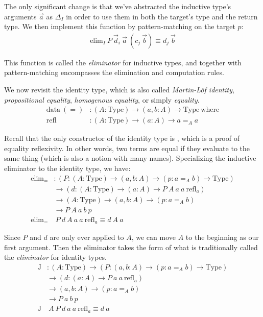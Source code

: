 \documentclass{report}
\newcommand{\const}[1]{\text{#1}}
\newcommand{\data}{\const{data}}
\newcommand{\Type}{\const{Type}}
\newcommand{\where}{\const{where}}
\newcommand{\elim}{\const{elim}}
\newcommand{\refl}{\const{refl}}
\newcommand{\jelim}{\const{J}\xspace}
\begin{document}
The only significant change is that we've abstracted the inductive type's arguments $\Vec{a}$ as $\Delta_I$ in order to use them in both the target's type and the return type. We then implement this function by pattern-matching on the target $p$:
%
\begin{align*}
    \elim_I ~ P ~ \Vec{d}_i ~ \Vec{a} ~ (c_j ~ \Vec{b}) \equiv d_j ~ \Vec{b}
\end{align*}

This function is called the \emph{eliminator} for inductive types, and together with pattern-matching encompasses the elimination and computation rules.

We now revisit the identity type, which is also called \emph{Martin-L\"of identity}, \emph{propositional equality}, \emph{homogenous equality}, or simply \emph{equality}.
%
\begin{align*}
    \data ~ (=) &: (A : \Type) \to (a, b : A) \to \Type ~ \where \\
    \refl &: (A : \Type) \to (a : A) \to a =_A a
\end{align*}

Recall that the only constructor of the identity type is \refl, which is a proof of equality reflexivity. In other words, two terms are equal if they evaluate to the same thing (which is also a notion with many names). Specializing the inductive eliminator to the identity type, we have:
%
\begin{align*}
    \elim_= &: (P : (A : \Type) \to (a, b : A) \to (p : a =_A b) \to \Type) \\
    &\to (d : (A : \Type) \to (a : A) \to P ~ A ~ a ~ a ~ \refl_a) \\
    &\to (A : \Type) \to (a, b : A) \to (p : a =_A b) \\
    &\to P ~ A ~ a ~ b ~ p \\
    \elim_= &~ P ~ d ~ A ~ a ~ a ~ \refl_a \equiv d ~ A ~ a
\end{align*}

Since $P$ and $d$ are only ever applied to $A$, we can move $A$ to the beginning as our first argument. Then the eliminator takes the form of what is traditionally called the \emph{\jelim eliminator} for identity types.
%
\begin{align*}
    \jelim &: (A : \Type) \to (P : (a, b : A) \to (p : a =_A b) \to \Type) \\
    &\to (d : (a : A) \to P ~ a ~ a ~ \refl_a) \\
    &\to (a, b : A) \to (p : a =_A b) \\
    &\to P ~ a ~ b ~ p \\
    \jelim &~ A ~ P ~ d ~ a ~ a ~ \refl_a \equiv d ~ a
\end{align*}
\end{document}

